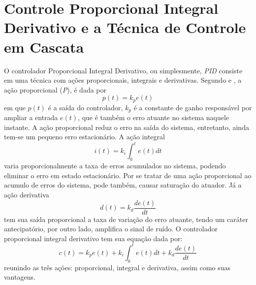 \section{Controle Proporcional Integral Derivativo e a Técnica de Controle em Cascata}
\label{sec:pid}
O controlador Proporcional Integral Derivativo, ou simplesmente, \emph{PID} consiste em uma técnica com ações proporcionais, integrais e derivativas. Segundo  e , a ação proporcional (\emph{P}), é dada por
\begin{equation}
p(t) = k_{p}e(t)
\end{equation}
em que $p(t)$ é a saída do controlador, $k_{p}$ é a constante de ganho responsável por ampliar a entrada $e(t)$, que é também o erro atuante no sistema naquele instante. A ação proporcional reduz o erro na saída do sistema, entretanto, ainda tem-se um pequeno erro estacionário. A ação integral
\begin{equation}
i(t) = k_{i}\int_0^t e(t) dt
\end{equation}
varia proporcionalmente a taxa de erros acumulados no sistema, podendo eliminar o erro em estado estacionário. Por se tratar de uma ação proporcional ao acumulo de erros do sistema, pode também, causar saturação do atuador. Já a ação derivativa
\begin{equation}
d(t) =  k_{d}\dfrac{de(t)}{dt}
\end{equation}  
tem sua saída proporcional a taxa de variação do erro atuante, tendo um caráter antecipatório, por outro lado, amplifica o sinal de ruído. O controlador proporcional integral derivativo tem sua equação dada por:
\begin{equation}
c(t) = k_{p}e(t) + k_{i}\int_0^t e(t) dt + k_{d}\dfrac{de(t)}{dt}
\label{eq:pid}
\end{equation}
reunindo as três ações: proporcional, integral e derivativa, assim como suas vantagens.

